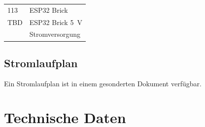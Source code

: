 \documentclass[a4paper,10pt]{article}
\begin{document}
\begin{multicols*}{2}
\begin{tabular}{ll}
		113                                                                                                 & ESP32 Brick                                           \\
		TBD                                                                                                 & ESP32 Brick \SI{5}{\volt}                             \\
		                                                                                                    & Stromversorgung                                       \\
		\bottomrule
	\end{tabular}

	\subsection{Stromlaufplan}
	Ein Stromlaufplan ist in einem gesonderten Dokument verfügbar.

	\section{Technische Daten}

	\begin{minipage}{\linewidth}


\end{minipage}
\end{multicols*}
\end{document}
